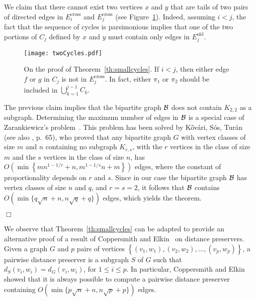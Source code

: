 \documentclass{article}
\newcommand{\dist}          {d}
\newcommand{\qed}{\hfill \ensuremath{\Box}}
\newenvironment{proof}{\vspace{1ex}\noindent{\bf Proof.}\hspace{0.5em}}
	{\hfill\qed\vspace{2ex}}
\newcommand{\commento}[1] {}
\newcommand{\braces}[1]       {\left\{ #1 \right\}}
\begin{document}
\begin{proof}
We claim that there cannot exist two vertices $x$ and $y$ that are tails of two pairs of directed edges in $E_i^{\mathrm{cross}}$ and $E_j^{\mathrm{cross}}$ (see Figure~\ref{fi:cycles}). Indeed, assuming $i < j$, the fact that the sequence of cycles is parsimonious implies that one of the two portions of $C_j$ defined by $x$ and $y$ must contain only edges in $E_j^{\mathrm{old}}$.
\begin{figure}[t]
\begin{center}
\texttt{[image: twoCycles.pdf]}
\end{center}
\caption{On the proof of Theorem~\ref{th:smallcycles}. If $i < j$, then either edge $f$ or $g$ in $C_j$ is not in $E_j^{\mathrm{cross}}$. In fact, either $\pi_1$ or $\pi_2$ should be included in $\bigcup_{k=1}^{j-1} C_k$.}\protect\label{fi:cycles}
\end{figure}
The previous claim implies that the bipartite graph $\cal{B}$ does not contain  $K_{2,2}$ as a subgraph.
Determining the maximum number of edges in $\cal{B}$ is a special case of Zarankiewicz's problem~\cite{Z51}.
This problem has been solved by K\H{o}v\'ari, S\'os, Tur\'an \cite{Kovari} (see also \cite{matousek}, p.\ 65), who proved that any bipartite graph $G$ with vertex classes of size $m$ and $n$ containing no subgraph $K_{r,s}$, with the $r$ vertices in the class of size $m$ and the $s$ vertices in the class of size $n$, has
$O\left(\min\left\{m n^{1-1/r}+n, m^{1-1/s} n +m \right\}\right)$
edges, where the constant of proportionality depends on $r$ and $s$.
Since in our case the bipartite graph $\cal B$ has vertex classes of size $n$ and $q$, and $r=s=2$,  it follows that $\cal B$  contains $O(\min\{q \sqrt{n}+n, n \sqrt{q}+q\})$ edges, which yields the theorem.
\commento{
In summary, the total number of edges in the graph $\bigcup_{i =1}^q C_i$ is bounded by
$$ \left|\bigcup_{i =1}^{q}  \left(E_i^{\mathrm{old}}\cup E_i^{\mathrm{new}}\cup E_i^{\mathrm{cross}}\right)\right| \leq 2  n + O\left(\min \left\{q \sqrt{n}+n, n \sqrt{q}+q\right\}\right)$$
 and thus the theorem holds.
 }
\end{proof}

We observe that Theorem~\ref{th:smallcycles} can be adapted to provide an alternative proof of a result of Coppersmith and Elkin~\cite{Coppersmith} on distance preservers. Given a graph $G$ and $p$ pairs of vertices $\braces{(v_1,w_1), (v_2,w_2), \ldots, (v_p,w_p)}$, a pairwise distance preserver is a subgraph $S$ of $G$ such that $\dist_S(v_i,w_i) =  \dist_G(v_i,w_i)$, for $1 \leq i \leq p$. In particular, Coppersmith and Elkin~\cite{Coppersmith} showed  that it is always possible to compute a pairwise distance preserver containing $O(\min\{p \sqrt{n}+n, n \sqrt{p}+p\})$ edges. 
\end{document}
